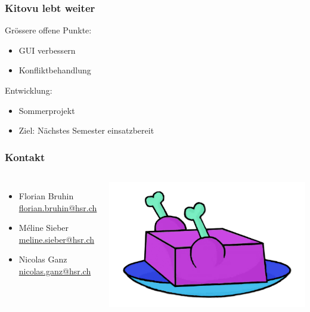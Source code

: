 \documentclass{beamer}
\begin{document}
  \begin{frame}
  \frametitle{Kitovu lebt weiter}

  Grössere offene Punkte:
  \begin{itemize}
    \item GUI verbessern
    \item Konfliktbehandlung
  \end{itemize}

  Entwicklung:
  \begin{itemize}
    \item Sommerprojekt
    \item Ziel: Nächstes Semester einsatzbereit
  \end{itemize}
  \end{frame}

  \begin{frame}
  \frametitle{Kontakt}
  \begin{columns}
    \begin{itemize}
      \item Florian Bruhin \\ \url{florian.bruhin@hsr.ch} \\[2em]
      \item Méline Sieber \\ \url{meline.sieber@hsr.ch} \\[2em]
      \item Nicolas Ganz \\ \url{nicolas.ganz@hsr.ch}
    \end{itemize}

		\includegraphics[width=\linewidth]{../../img/logo/kitovu.jpg}
  \end{columns}
  \end{frame}
\end{document}

